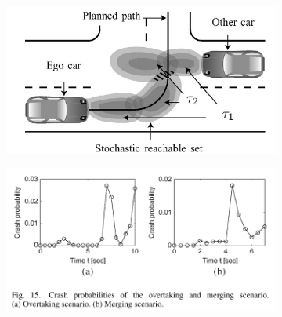 \begin{figure}[!ht]
    \begin{subfigure}{0.4\textwidth}
        \includegraphics[width=\textwidth]{img/31}\label{fig:31}
    \end{subfigure}
    \begin{subfigure}{0.4\textwidth}
        \includegraphics[width=\textwidth]{img/35}\label{fig:35}
    \end{subfigure}
    \vspace{2cm}
    \begin{subfigure}{0.4\textwidth}

\end{subfigure}
\end{figure}

